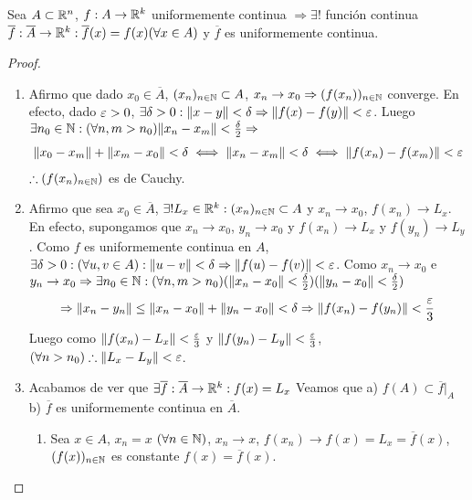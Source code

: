 \clearpage

\begin{theorem}
  Sea \(A \subset \mathbb{R}^n\), \(f: A \to \mathbb{R}^k\) uniformemente continua \(\Rightarrow \exists !\) función continua \(\overline{f}: \overline{A} \to \mathbb{R}^k : \overline{f}(x) = f(x) (\forall x \in A)\) y \(\overline{f}\) es uniformemente continua.
  \begin{proof}
    \begin{enumerate}
      \item Afirmo que dado \(x_0 \in \overline{A}\), \((x_n)_{n \in \mathbb{N}} \subset A\), \(x_n \to x_0 \Rightarrow (f(x_n))_{n \in \mathbb{N}}\) converge. En efecto, dado \(\varepsilon > 0\), \(\exists \delta > 0 : \|x-y\| < \delta \Rightarrow \|f(x) - f(y)\| < \varepsilon\). Luego \(\exists n_0 \in \mathbb{N} : (\forall n, m > n_0) \|x_n - x_m\| < \frac{\delta}{2} \Rightarrow\) \begin{align*}
              \|x_0 - x_m\| + \|x_m - x_0\| < \delta \iff \|x_n - x_m\| < \delta \iff \|f(x_n) - f(x_m)\| < \varepsilon
            \end{align*} \(\therefore (f(x_n)_{n \in \mathbb{N}})\) es de Cauchy.
      \item Afirmo que sea \(x_0 \in \overline{A}\), \(\exists ! L_x \in \mathbb{R}^k : (x_n)_{n \in \mathbb{N}} \subset A\) y \(x_n \to x_0\), \(f(x_n) \to L_x\). En efecto, supongamos que \(x_n \to x_0\), \(y_n \to x_0\) y \(f(x_n) \to L_x\) y \(f(y_n) \to L_y\). Como \(f\) es uniformemente continua en \(A\), \(\exists \delta > 0 : (\forall u, v \in A) : \|u-v\| < \delta \Rightarrow \|f(u) - f(v)\| < \varepsilon\). Como \(x_n \to x_0\) e \(y_n \to x_0 \Rightarrow \exists n_0 \in \mathbb{N} : (\forall n, m > n_0) (\|x_n - x_0\| < \frac{\delta}{2}) (\| y_n - x_0 \| < \frac{\delta}{2})\) \begin{align*}
              \Rightarrow \|x_n - y_n\| \leq \|x_n - x_0\| + \|y_n - x_0\| < \delta \Rightarrow \|f(x_n) - f(y_n)\| < \frac{\varepsilon}{3}
            \end{align*} Luego como \(\|f(x_n) - L_x\| < \frac{\varepsilon}{3}\) y \(\|f(y_n) - L_y\| < \frac{\varepsilon}{3}\), \((\forall n > n_0) \therefore \|L_x - L_y\| < \varepsilon\).
      \item Acabamos de ver que \(\exists \overline{f}: \overline{A} \to \mathbb{R}^k : f(x) = L_x\) Veamos que a) \(f(A) \subset \overline{f}|_A\) b) \(\overline{f}\) es uniformemente continua en \(\overline{A}\). \begin{enumerate}
              \item Sea \(x \in A\), \(x_n = x\) \((\forall n \in \mathbb{N})\), \(x_n \to x\), \(f(x_n) \to f(x) = L_x = \overline{f}(x)\), \((f(x))_{n \in \mathbb{N}}\) es constante \(f(x) = \overline{f}(x)\).

\end{enumerate}
\end{enumerate}
\end{proof}
\end{theorem}
